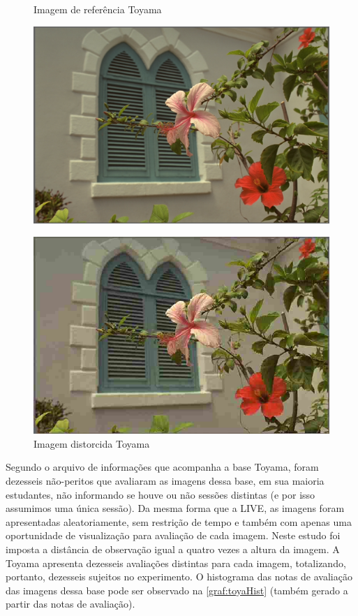\begin{figure}[htb]
 \label{fig:toyaex}
 \centering
  \begin{minipage}{0.48\textwidth}
    \centering
    \caption{Imagem de referência Toyama} \label{fig:toyaref}
    \includegraphics[width=\textwidth]{../img/toyaref07.pdf}
  \end{minipage}
  \hfill
  \begin{minipage}{0.48\textwidth}
    \centering
    \caption{Imagem distorcida Toyama} \label{fig:toyadist}
    \includegraphics[width=\textwidth]{../img/toyadist07_79.pdf}
  \end{minipage}
\end{figure}

Segundo o arquivo de informações que acompanha a base Toyama, foram dezesseis não-peritos que avaliaram as imagens dessa base, em sua maioria estudantes, não informando se houve ou não sessões distintas (e por isso assumimos uma única sessão). Da mesma forma que a LIVE, as imagens foram apresentadas aleatoriamente, sem restrição de tempo e também com apenas uma oportunidade de visualização para avaliação de cada imagem. Neste estudo foi imposta a distância de observação igual a quatro vezes a altura da imagem. A Toyama apresenta dezesseis avaliações distintas para cada imagem, totalizando, portanto, dezesseis sujeitos no experimento. O histograma das notas de avaliação das imagens dessa base pode ser observado na \autoref{graf:toyaHist} (também gerado a partir das notas de avaliação).
 


